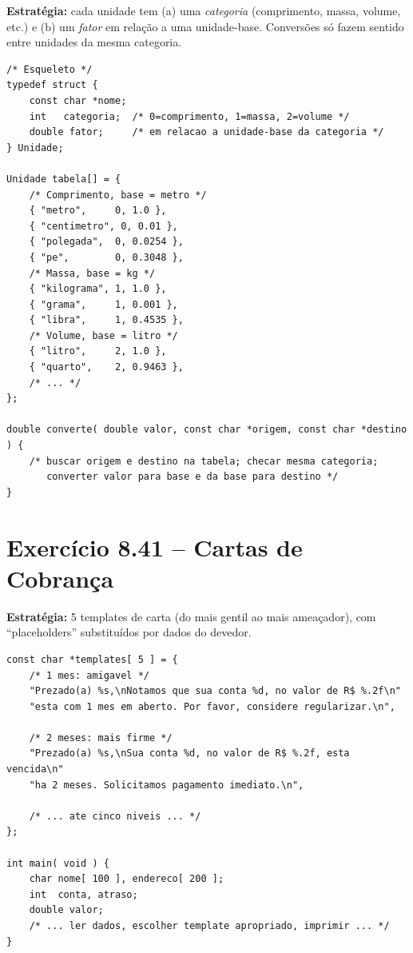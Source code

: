 \documentclass[12pt,a4paper]{article}
\begin{document}
\begin{respostabox}
\textbf{Estratégia:} cada unidade tem (a) uma \textit{categoria} (comprimento, massa,
volume, etc.) e (b) um \textit{fator} em relação a uma unidade-base. Conversões
só fazem sentido entre unidades da mesma categoria.

\begin{lstlisting}
/* Esqueleto */
typedef struct {
    const char *nome;
    int   categoria;  /* 0=comprimento, 1=massa, 2=volume */
    double fator;     /* em relacao a unidade-base da categoria */
} Unidade;

Unidade tabela[] = {
    /* Comprimento, base = metro */
    { "metro",     0, 1.0 },
    { "centimetro", 0, 0.01 },
    { "polegada",  0, 0.0254 },
    { "pe",        0, 0.3048 },
    /* Massa, base = kg */
    { "kilograma", 1, 1.0 },
    { "grama",     1, 0.001 },
    { "libra",     1, 0.4535 },
    /* Volume, base = litro */
    { "litro",     2, 1.0 },
    { "quarto",    2, 0.9463 },
    /* ... */
};

double converte( double valor, const char *origem, const char *destino ) {
    /* buscar origem e destino na tabela; checar mesma categoria;
       converter valor para base e da base para destino */
}
\end{lstlisting}
\end{respostabox}

\section{Exercício 8.41 -- Cartas de Cobrança}

\begin{respostabox}
\textbf{Estratégia:} 5 templates de carta (do mais gentil ao mais ameaçador), com
``placeholders'' substituídos por dados do devedor.

\begin{lstlisting}
const char *templates[ 5 ] = {
    /* 1 mes: amigavel */
    "Prezado(a) %s,\nNotamos que sua conta %d, no valor de R$ %.2f\n"
    "esta com 1 mes em aberto. Por favor, considere regularizar.\n",

    /* 2 meses: mais firme */
    "Prezado(a) %s,\nSua conta %d, no valor de R$ %.2f, esta vencida\n"
    "ha 2 meses. Solicitamos pagamento imediato.\n",

    /* ... ate cinco niveis ... */
};

int main( void ) {
    char nome[ 100 ], endereco[ 200 ];
    int  conta, atraso;
    double valor;
    /* ... ler dados, escolher template apropriado, imprimir ... */
}
\end{lstlisting}
\end{respostabox}
\end{document}
